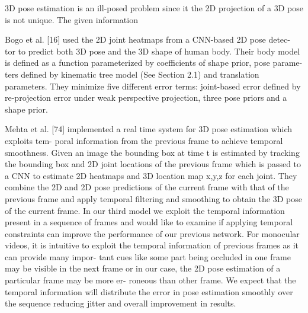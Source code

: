 3D pose estimation is an ill-posed problem since it the 2D projection of a 3D pose is not unique. The given information  

\parencite{zhou2016deep}

\parencite{chen2017adversarial}
\parencite{wan2017deepskeleton}
\parencite{fang2018learning}
\parencite{sun2017compositional}

\parencite{mehta2017single}
\parencite{kanazawa2017end}
\parencite{dabral2017structure}
\parencite{huang2017towards}

\parencite{bogo2016keep}
Bogo et al. [16] used the 2D joint heatmaps from a CNN-based 2D pose detec-
tor to predict both 3D pose and the 3D shape of human body. Their body model
is defined as a function parameterized by coefficients of shape prior, pose parame-
ters defined by kinematic tree model (See Section 2.1) and translation parameters.
They minimize five different error terms: joint-based error defined by re-projection
error under weak perspective projection, three pose priors and a shape prior. 

\parencite{mehta2017vnect}
Mehta et al.
[74] implemented a real time system for 3D pose estimation which exploits tem-
poral information from the previous frame to achieve temporal smoothness. Given
an image the bounding box at time t is estimated by tracking the bounding box
and 2D joint locations of the previous frame which is passed to a CNN to estimate
2D heatmaps and 3D location map x,y,z for each joint. They combine the 2D and
2D pose predictions of the current frame with that of the previous frame and apply
temporal filtering and smoothing to obtain the 3D pose of the current frame.
In our third model we exploit the temporal information present in a sequence
of frames and would like to examine if applying temporal constraints can improve
the performance of our previous network. For monocular videos, it is intuitive to
exploit the temporal information of previous frames as it can provide many impor-
tant cues like some part being occluded in one frame may be visible in the next
frame or in our case, the 2D pose estimation of a particular frame may be more er-
roneous than other frame. We expect that the temporal information will distribute
the error in pose estimation smoothly over the sequence reducing jitter and overall
improvement in results.

